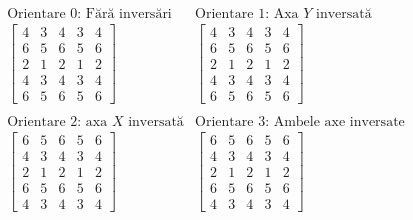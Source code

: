 \documentclass[12pt]{article}
\begin{document}
\[
\begin{array}{cc}
\text{Orientare $0$: Fără inversări} & \text{Orientare $1$: Axa $Y$ inversată} \\
\left[
\begin{array}{ccccc}
4 & 3 & 4 & 3 & 4 \\
6 & 5 & 6 & 5 & 6 \\
2 & 1 & 2 & 1 & 2 \\
4 & 3 & 4 & 3 & 4 \\
6 & 5 & 6 & 5 & 6
\end{array}
\right]
&
\left[
\begin{array}{ccccc}
4 & 3 & 4 & 3 & 4 \\
6 & 5 & 6 & 5 & 6 \\
2 & 1 & 2 & 1 & 2 \\
4 & 3 & 4 & 3 & 4 \\
6 & 5 & 6 & 5 & 6
\end{array}
\right]
\\
\\
\text{Orientare $2$: axa $X$ inversată} & \text{Orientare $3$: Ambele axe inversate} \\
\left[
\begin{array}{ccccc}
6 & 5 & 6 & 5 & 6 \\
4 & 3 & 4 & 3 & 4 \\
2 & 1 & 2 & 1 & 2 \\
6 & 5 & 6 & 5 & 6 \\
4 & 3 & 4 & 3 & 4
\end{array}
\right]
&
\left[
\begin{array}{ccccc}
6 & 5 & 6 & 5 & 6 \\
4 & 3 & 4 & 3 & 4 \\
2 & 1 & 2 & 1 & 2 \\
6 & 5 & 6 & 5 & 6 \\
4 & 3 & 4 & 3 & 4
\end{array}
\right]
\end{array}
\] 

\end{document}
